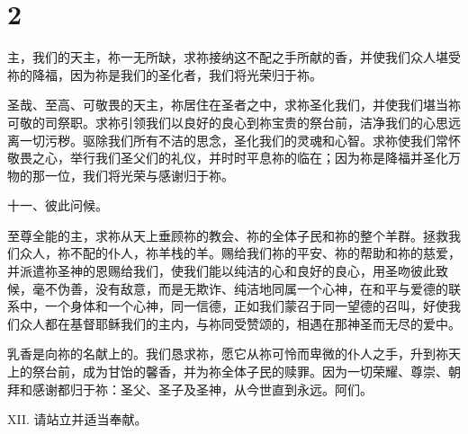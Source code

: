 \section{2}

\par

\par

主，我们的天主，祢一无所缺，求祢接纳这不配之手所献的香，并使我们众人堪受祢的降福，因为祢是我们的圣化者，我们将光荣归于祢。\par

\par

圣哉、至高、可敬畏的天主，祢居住在圣者之中，求祢圣化我们，并使我们堪当祢可敬的司祭职。求祢引领我们以良好的良心到祢宝贵的祭台前，洁净我们的心思远离一切污秽。驱除我们所有不洁的思念，圣化我们的灵魂和心智。求祢使我们常怀敬畏之心，举行我们圣父们的礼仪，并时时平息祢的临在；因为祢是降福并圣化万物的那一位，我们将光荣与感谢归于祢。\par

\par

十一、彼此问候。\par

\par

至尊全能的主，求祢从天上垂顾祢的教会、祢的全体子民和祢的整个羊群。拯救我们众人，祢不配的仆人，祢羊栈的羊。赐给我们祢的平安、祢的帮助和祢的慈爱，并派遣祢圣神的恩赐给我们，使我们能以纯洁的心和良好的良心，用圣吻彼此致候，毫不伪善，没有敌意，而是无欺诈、纯洁地同属一个心神，在和平与爱德的联系中，一个身体和一个心神，同一信德，正如我们蒙召于同一望德的召叫，好使我们众人都在基督耶稣我们的主内，与祢同受赞颂的，相遇在那神圣而无尽的爱中。\par

\par

乳香是向祢的名献上的。我们恳求祢，愿它从祢可怜而卑微的仆人之手，升到祢天上的祭台前，成为甘饴的馨香，并为祢全体子民的赎罪。因为一切荣耀、尊崇、朝拜和感谢都归于祢：圣父、圣子及圣神，从今世直到永远。阿们。\par

\par

XII. 请站立并适当奉献。\par

